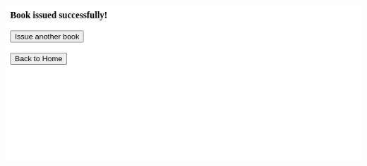 \documentclass{article}
\begin{document}
\begin{enumerate}
	\\ \includegraphics[scale=0.6]{screenshots/partb/issued.png}
\end{enumerate}
\end{document}
